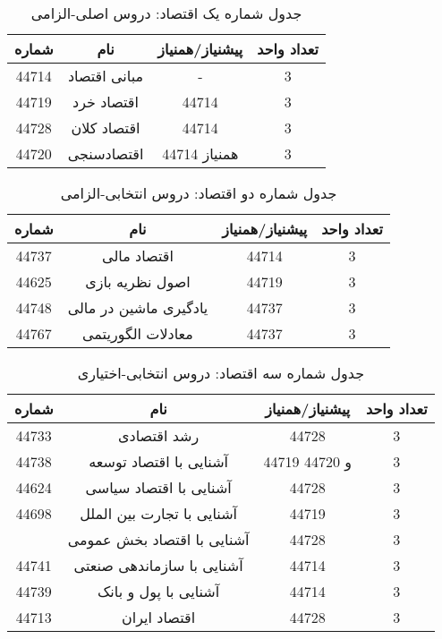 \documentclass[class=article, crop=false]{standalone}
\begin{document}
	\begin{table}[H]
		\begin{center}
		\begin{tabular}{|c|c|c|c|}
			\hline
			شماره & نام & پیشنیاز/همنیاز & تعداد واحد \\
			\hline
			44714 & مبانی اقتصاد & - & 3 \\
			\hline
			44719 & اقتصاد خرد & 44714 & 3 \\
			\hline
			44728 & اقتصاد کلان & 44714 & 3 \\
			\hline
			44720 & اقتصادسنجی & 44714 همنیاز & 3 \\
			\hline
		\end{tabular}
		\caption{\label{eco-t1}
		جدول شماره یک اقتصاد: دروس اصلی-الزامی
		}
	\end{center}
	\end{table}
	\begin{table}[H]
	\begin{center}
		\begin{tabular}{|c|c|c|c|}
			\hline
			شماره & نام & پیشنیاز/همنیاز & تعداد واحد \\
			\hline
			44737 & اقتصاد مالی & 44714 & 3 \\
			\hline
			44625 & اصول نظریه بازی & 44719 & 3 \\
			\hline
			44748 & یادگیری ماشین در مالی & 44737 & 3 \\
			\hline
			44767 & معادلات الگوریتمی & 44737 & 3 \\
			\hline
		\end{tabular}
		\caption{\label{eco-t2}
		جدول شماره دو اقتصاد: دروس انتخابی-الزامی
		}
	\end{center}
	\end{table}
	\begin{table}[H]
	\begin{center}
		\begin{tabular}{|c|c|c|c|}
			\hline
			شماره &  نام  &  پیشنیاز/همنیاز  & 	تعداد واحد  \\
			\hline
			44733 &  رشد اقتصادی  &  44728  & 	3  \\
			\hline
			44738 &  آشنایی با اقتصاد توسعه  &   44719 و 44720  & 	3  \\
			\hline
			44624 &  آشنایی با اقتصاد سیاسی  &  44728  & 	3  \\
			\hline
			44698 &  آشنایی با تجارت بین الملل  &  44719  & 	3  \\
			\hline
			&  آشنایی با اقتصاد بخش عمومی  &  44728  & 	3  \\
			\hline
			44741 &  آشنایی با سازماندهی صنعتی  &  44714  & 	3  \\
			\hline
			44739 &  آشنایی با پول و بانک  &  44714  & 	3  \\
			\hline
			44713 &  اقتصاد ایران  &  44728  & 	3  \\
			\hline
		\end{tabular}
		\caption{\label{eco-t3}
		جدول شماره سه اقتصاد: دروس انتخابی-اختیاری
		}
	\end{center}
	\end{table}
\end{document}
